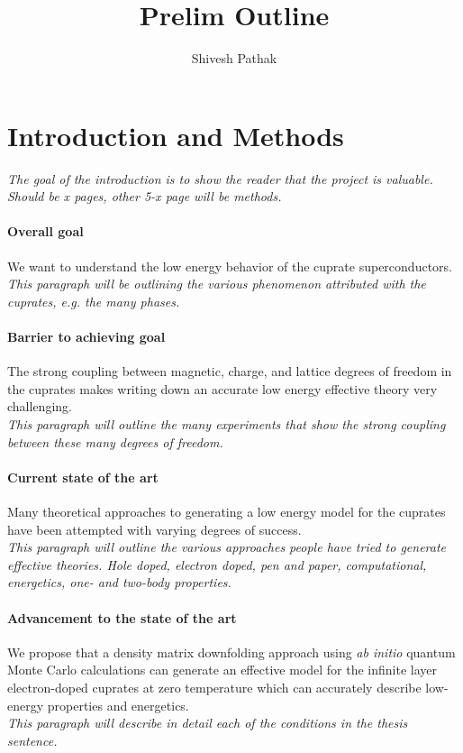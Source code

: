 \documentclass{article}
\title{Prelim Outline}
\author{Shivesh Pathak}
\begin{document}
\maketitle

\section{Introduction and Methods}
\textit{The goal of the introduction is to show the reader that the project is valuable. Should be x pages, other 5-x page will be methods.}
\paragraph{Overall goal}
We want to understand the low energy behavior of the cuprate superconductors.
\\
\textit{This paragraph will be outlining the various phenomenon attributed with the cuprates, e.g. the many phases.}

\paragraph{Barrier to achieving goal}
The strong coupling between magnetic, charge, and lattice degrees of freedom in the cuprates makes writing down an accurate low energy effective theory very challenging.
\\
\textit{This paragraph will outline the many experiments that show the strong coupling between these many degrees of freedom.}

\paragraph{Current state of the art}
Many theoretical approaches to generating a low energy model for the cuprates have been attempted with varying degrees of success.
\\
\textit{This paragraph will outline the various approaches people have tried to generate effective theories. Hole doped, electron doped, pen and paper, computational, energetics, one- and two-body properties.}

\paragraph{Advancement to the state of the art}
We propose that a density matrix downfolding approach using \textit{ab initio} quantum Monte Carlo calculations can generate an effective model for the infinite layer electron-doped cuprates at zero temperature which can accurately describe low-energy properties and energetics. 
\\
\textit{This paragraph will describe in detail each of the conditions in the thesis sentence.}
\end{document}
